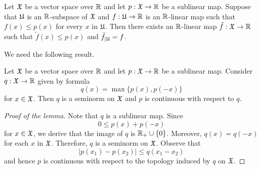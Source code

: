 \begin{theorem}\label{theorem:Hahn_Banach_real_case}
Let ${\mathfrak X}$ be a vector space over ${\mathbb R}$ and let $p:{\mathfrak X}\rightarrow {\mathbb R}$ be a sublinear map. Suppose that ${\mathfrak U}$ is an ${\mathbb R}$-subspace of ${\mathfrak X}$ and $f:{\mathfrak U}\rightarrow {\mathbb R}$ is an ${\mathbb R}$-linear map such that $f(x) \leq p(x)$ for every $x$ in ${\mathfrak U}$. Then there exists an ${\mathbb R}$-linear map $\tilde{f}:{\mathfrak X} \rightarrow {\mathbb R}$ such that $\tilde{f}(x) \leq p(x)$ and $\tilde{f}_{\mid {\mathfrak U}} = f$. 
\end{theorem}
\noindent
We need the following result.

\begin{lemma}\label{lemma:sublinear_induces_seminorm_and_is_continuous_with_respect_to_it}
Let ${\mathfrak X}$ be a vector space over ${\mathbb R}$ and let $p:{\mathfrak X} \rightarrow {\mathbb R}$ be a sublinear map. Consider $q:{\mathfrak X} \rightarrow {\mathbb R}$ given by formula
$$q(x) = \max\{p(x),p(-x)\}$$
for $x \in {\mathfrak X}$. Then $q$ is a seminorm on ${\mathfrak X}$ and $p$ is continuous with respect to $q$. 
\end{lemma}
\begin{proof}[Proof of the lemma]
Note that $q$ is a sublinear map. Since 
$$0\leq p(x) + p(-x)$$
for $x \in {\mathfrak X}$, we derive that the image of $q$ is ${\mathbb R}_+\cup \{0\}$. Moreover, $q(x) = q(-x)$ for each $x$ in ${\mathfrak X}$. Therefore, $q$ is a seminorm on ${\mathfrak X}$. Observe that
$$|p(x_1) - p(x_2)|\leq q(x_1 - x_2)$$
and hence $p$ is continuous with respect to the topology induced by $q$ on ${\mathfrak X}$.
\end{proof}

